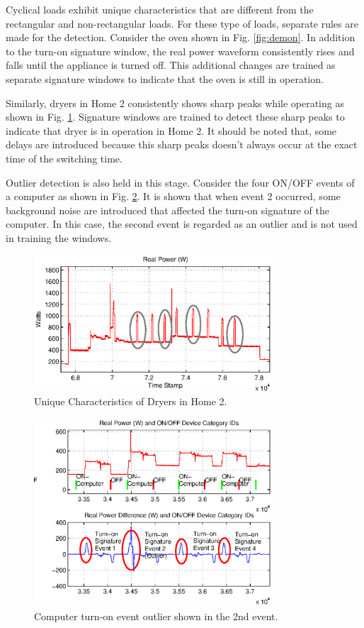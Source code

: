 \documentclass[conference]{IEEEtran}
\begin{document}
Cyclical loads exhibit unique characteristics that are different from the rectangular and non-rectangular loads.  For these type of loads, separate rules are made for the detection.  Consider the oven shown in Fig. \ref{fig:demon}.  In addition to the turn-on signature window, the real power waveform consistently rises and falls until the appliance is turned off.  This additional changes are trained as separate signature windows to indicate that the oven is still in operation.  

Similarly, dryers in Home 2 consistently shows sharp peaks while operating as shown in Fig. \ref{fig:dryerH2}.  Signature windows are trained to detect these sharp peaks to indicate that dryer is in operation in Home 2.  It should be noted that, some delays are introduced because this sharp peaks doesn't always occur at the exact time of the switching time.

Outlier detection is also held in this stage.  Consider the four ON/OFF events of a computer as shown in Fig. \ref{fig:outlier}.  It is shown that when event 2 occurred, some background noise are introduced that affected the turn-on signature of the computer.  In this case, the second event is regarded as an outlier and is not used in training the windows.

\begin{figure}[!t]
	\centering
	\includegraphics[width=3.5in]{fig/dryerH2.eps}
	\caption{Unique Characteristics of Dryers in Home 2.}
	\label{fig:dryerH2}
\end{figure}
	
\begin{figure}[!t]
	\centering
	\includegraphics[width=3.5in]{fig/outlier.eps}
	\caption{Computer turn-on event outlier shown in the 2nd event.}
	\label{fig:outlier}
\end{figure}
\end{document}

